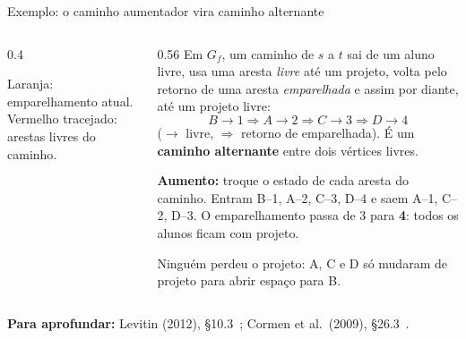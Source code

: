 \documentclass[aspectratio=169,xcolor=table]{beamer}
\newcommand{\arestasbip}{A/p1, A/p2, B/p1, C/p2, C/p3, D/p3, D/p4}
\newcommand{\nosbip}{%
  \node[vert] (A) at (0,1.2)  {A};  \node[vert] (B) at (0,0.4)  {B};
  \node[vert] (C) at (0,-0.4) {C};  \node[vert] (D) at (0,-1.2) {D};
  \node[vert] (p1) at (2,1.2)  {1}; \node[vert] (p2) at (2,0.4)  {2};
  \node[vert] (p3) at (2,-0.4) {3}; \node[vert] (p4) at (2,-1.2) {4};
}
\newcommand{\bip}[2]{%
  \nosbip
  \foreach \u/\v in \arestasbip \draw[aresta] (\u) -- (\v);
  \def\lista{#1}\ifx\lista\empty\else
    \foreach \u/\v in {#1} \draw[emp] (\u) -- (\v);\fi
  \def\lista{#2}\ifx\lista\empty\else
    \foreach \u/\v in {#2} \draw[alt] (\u) -- (\v);\fi
}
\newcommand{\fonte}[1]{%
  \vfill
  {\tiny\color{gray!55!black}\textbf{Para aprofundar:} #1\par}%
}
\begin{document}
\begin{frame}{Exemplo: o caminho aumentador vira caminho alternante}
  \begin{columns}[c]
    \begin{column}{0.4\textwidth}
      \begin{center}
      \end{center}
      {\scriptsize Laranja: emparelhamento atual. Vermelho tracejado: arestas livres do
      caminho.\par}
    \end{column}
    \begin{column}{0.56\textwidth}
      \scriptsize
      Em $G_f$, um caminho de $s$ a $t$ sai de um aluno livre, usa uma aresta \emph{livre} até
      um projeto, volta pelo retorno de uma aresta \emph{emparelhada} e assim por diante, até
      um projeto livre:
      \[ B \to 1 \Rightarrow A \to 2 \Rightarrow C \to 3 \Rightarrow D \to 4 \]
      ($\to$ livre, $\Rightarrow$ retorno de emparelhada). É um \textbf{caminho alternante}
      entre dois vértices livres.
      \medskip

      \textbf{Aumento:} troque o estado de cada aresta do caminho. Entram B--1, A--2, C--3,
      D--4 e saem A--1, C--2, D--3. O emparelhamento passa de 3 para \textbf{4}: todos os
      alunos ficam com projeto.
      \medskip

      Ninguém perdeu o projeto: A, C e D só mudaram de projeto para abrir espaço para B.
    \end{column}
  \end{columns}
  \fonte{Levitin (2012), \S 10.3~\cite{levitin2012introduction};
    Cormen et al.\ (2009), \S 26.3~\cite{cormen2009introduction}.}
\end{frame}
\end{document}
